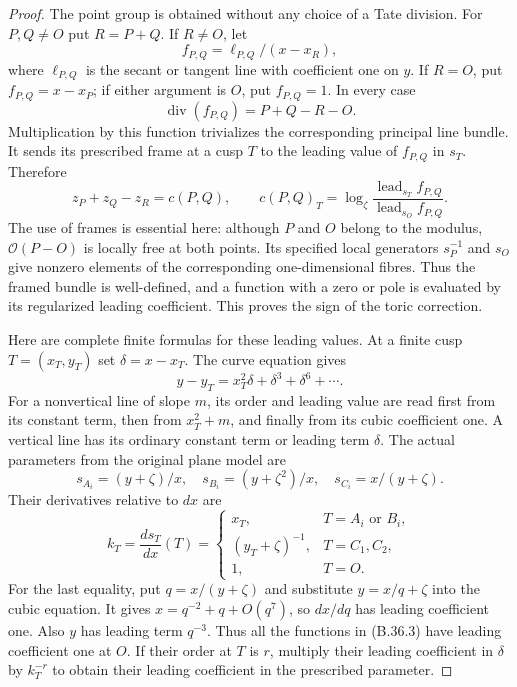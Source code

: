 \begin{proof}
The point group is obtained without any choice of a
Tate division.  For $P,Q\ne O$ put $R=P+Q$.
If $R\ne O$, let
\[
 f_{P,Q}=\ell_{P,Q}/(x-x_R),
\]
where $\ell_{P,Q}$ is the secant or tangent line with
coefficient one on $y$.
If $R=O$, put $f_{P,Q}=x-x_P$; if either argument is
$O$, put $f_{P,Q}=1$.
In every case
\[
          \operatorname{div}(f_{P,Q})=P+Q-R-O.
\]
Multiplication by this function trivializes the
corresponding principal line bundle.  It sends its
prescribed frame at a cusp $T$ to the leading value
of $f_{P,Q}$ in $s_T$.  Therefore
\[
 z_P+z_Q-z_R=c(P,Q),\qquad
 c(P,Q)_T=
 \log_\zeta\frac{\operatorname{lead}_{s_T}f_{P,Q}}
                         {\operatorname{lead}_{s_O}f_{P,Q}}.
                                                               \tag{B.36.3}
\]
The use of frames is essential here: although $P$ and
$O$ belong to the modulus, $\mathcal O(P-O)$ is locally
free at both points. Its specified local generators
$s_P^{-1}$ and $s_O$ give nonzero elements of the
corresponding one-dimensional fibres. Thus the framed
bundle is well-defined, and a function with a zero or
pole is evaluated by its regularized leading coefficient.
This proves the sign of the toric correction.

Here are complete finite formulas for these leading
values.  At a finite cusp $T=(x_T,y_T)$ set
$\delta=x-x_T$.  The curve equation gives
\[
 y-y_T=x_T^2\delta+\delta^3+\delta^6+\cdots.
                                                               \tag{B.36.4}
\]
For a nonvertical line of slope $m$, its order and
leading value are read first from its constant term,
then from $x_T^2+m$, and finally from its cubic
coefficient one.  A vertical line has its ordinary
constant term or leading term $\delta$.
The actual parameters from the original plane model
are
\[
 s_{A_i}=(y+\zeta)/x,\quad
 s_{B_i}=(y+\zeta^2)/x,\quad
 s_{C_i}=x/(y+\zeta).
\]
Their derivatives relative to $dx$ are
\[
 k_T=\frac{ds_T}{dx}(T)=
 \begin{cases}
 x_T,&T=A_i\text{ or }B_i,\\
 (y_T+\zeta)^{-1},&T=C_1,C_2,\\
 1,&T=O.
 \end{cases}                                                   \tag{B.36.5}
\]
For the last equality, put $q=x/(y+\zeta)$ and
substitute $y=x/q+\zeta$ into the cubic equation.
It gives $x=q^{-2}+q+O(q^7)$, so $dx/dq$ has leading
coefficient one.  Also $y$ has leading term $q^{-3}$.
Thus all the functions in (B.36.3) have leading coefficient
one at $O$.
If their order at $T$ is $r$, multiply their leading
coefficient in $\delta$ by $k_T^{-r}$ to obtain their
leading coefficient in the prescribed parameter.


\end{proof}
